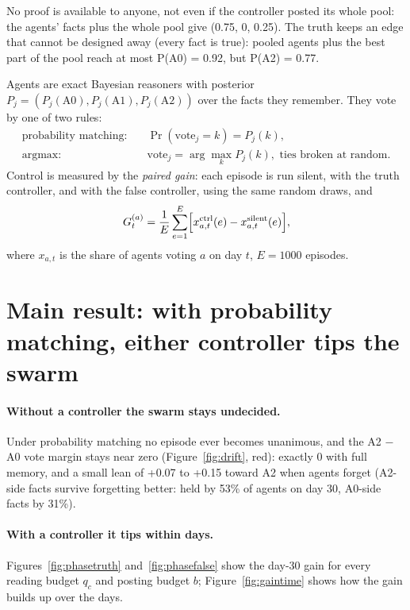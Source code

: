 \documentclass[10pt,a4paper]{article}
\begin{document}
No proof is available to anyone, not even if the controller posted its whole pool: the
agents' facts plus the whole pool give (0.75, 0, 0.25). The truth keeps an edge that
cannot be designed away (every fact is true): pooled agents plus the best part of the
pool reach at most P(A0) = 0.92, but P(A2) = 0.77.

Agents are exact Bayesian reasoners with posterior $P_j = (P_j(\text{A0}), P_j(\text{A1}), P_j(\text{A2}))$
over the facts they remember. They vote by one of two rules:
\begin{align}
\text{probability matching:}\quad & \Pr(\text{vote}_j = k) = P_j(k), \label{eq:pm}\\
\text{argmax:}\quad & \text{vote}_j = \arg\max_k P_j(k), \text{ ties broken at random.} \label{eq:argmax}
\end{align}
Control is measured by the \emph{paired gain}: each episode is run silent, with the truth
controller, and with the false controller, using the same random draws, and
\begin{equation}\label{eq:gain}
G_t^{(a)} = \frac{1}{E}\sum_{e=1}^{E}\Bigl[x_{a,t}^{\text{ctrl}}(e) - x_{a,t}^{\text{silent}}(e)\Bigr],
\end{equation}
where $x_{a,t}$ is the share of agents voting $a$ on day $t$, $E = 1000$ episodes.

\section{Main result: with probability matching, either controller tips the swarm}

\paragraph{Without a controller the swarm stays undecided.} Under probability matching
no episode ever becomes unanimous, and the A2 $-$ A0 vote margin stays near zero
(Figure~\ref{fig:drift}, red): exactly 0 with full memory, and a small lean of
+0.07 to +0.15 toward A2 when agents forget (A2-side facts survive forgetting better:
held by 53\% of agents on day 30, A0-side facts by 31\%).

\paragraph{With a controller it tips within days.} Figures~\ref{fig:phasetruth}
and~\ref{fig:phasefalse} show the day-30 gain for every reading budget $q_c$ and posting
budget $b$; Figure~\ref{fig:gaintime} shows how the gain builds up over the days.
\end{document}
